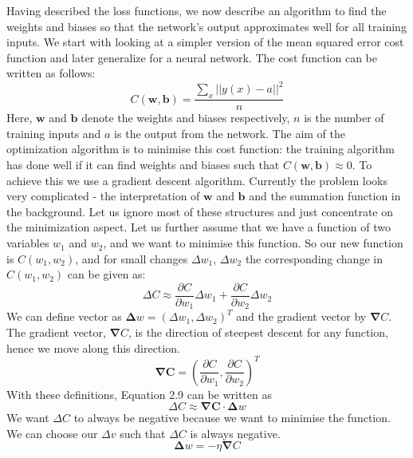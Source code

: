 Having described the loss functions, we now describe an algorithm to find the weights and biases so that the network's output approximates well for all training inputs. We start with looking at a simpler version of the mean squared error cost function and later generalize for a neural network. The cost function can be written as follows:
\begin{equation}
C(\boldsymbol{w},\boldsymbol{b}) = \frac{\displaystyle\sum\limits_x ||y(x) - a||^2}{n}
\end{equation}
Here, $\boldsymbol{w}$ and $\boldsymbol{b}$ denote the weights and biases respectively, $n$ is the number of training inputs and $a$ is the output from the network. The aim of the optimization algorithm is to minimise this cost function: the training algorithm has done well if it can find weights and biases such that $C(\boldsymbol{w},\boldsymbol{b})\approx 0$. To achieve this we use a gradient descent algorithm. Currently the problem looks very complicated - the interpretation of $\boldsymbol{w}$ and $\boldsymbol{b}$ and the summation function in the background. Let us ignore most of these structures and just concentrate on the minimization aspect. Let us further assume that we have a function of two variables $w_1$ and $w_2$, and we want to minimise this function. So our new function is $C(w_1, w_2)$, and for small changes $\Delta w_1$, $\Delta w_2$ the corresponding change in $C(w_1, w_2)$ can be given as:
\begin{equation}
\Delta C \approx \frac{\partial C}{\partial w_1}\Delta w_1 + \frac{\partial C}{\partial w_2}\Delta w_2
\end{equation}
We can define vector as $\boldsymbol\Delta w = (\Delta w_1, \Delta w_2)^T$ and the gradient vector by $\boldsymbol\nabla C$. The gradient vector, $\boldsymbol\nabla C$, is the direction of steepest descent for any function, hence we move along this direction.
\begin{equation}
\boldsymbol{\nabla C} = \left(\frac{\partial C}{\partial w_1}, \frac{\partial C}{\partial w_2}\right)^T
\end{equation}
With these definitions, Equation 2.9 can be written as
\begin{equation}
\Delta C \approx \boldsymbol{\nabla C}\cdot \boldsymbol \Delta w
\end{equation}
We want $\Delta C$ to always be negative because we want to minimise the function. We can choose our $\Delta v$ such that $\Delta C$ is always negative. \cite{nielsen2015neural}
\begin{equation}
\boldsymbol\Delta w = -\eta\boldsymbol\nabla C
\end{equation}
